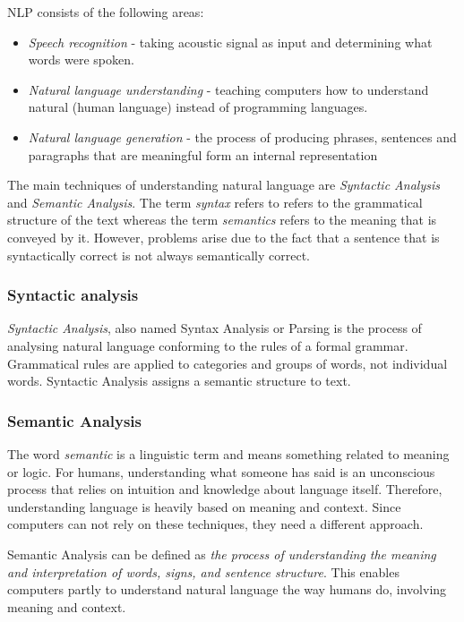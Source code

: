 \documentclass[12pt,a4paper]{article}
\begin{document}
NLP consists of the following areas:
\begin{itemize}
    \item \textit{Speech recognition} - taking acoustic signal as input and determining what words were spoken.
    \item \textit{Natural language understanding} - teaching computers how to understand natural (human language) instead of programming languages.
    \item \textit{Natural language generation} - the process of producing phrases, sentences and paragraphs that are meaningful form an internal representation \cite{Khurana2017}
\end{itemize}

The main techniques of understanding natural language are \textit{Syntactic Analysis} and \textit{Semantic Analysis}. The term \textit{syntax} refers to refers to the grammatical structure of the text whereas the term \textit{semantics} refers to the meaning that is conveyed by it. However, problems arise due to the fact that a sentence that is syntactically correct is not always semantically correct.

\subsubsection{Syntactic analysis}
\textit{Syntactic Analysis}, also named Syntax Analysis or Parsing is the process of analysing natural language conforming to the rules of a formal grammar. Grammatical rules are applied to categories and groups of words, not individual words. Syntactic Analysis assigns a semantic structure to text.

\subsubsection{Semantic Analysis}
The word \textit{semantic} is a linguistic term and means something related to meaning or logic.
For humans, understanding what someone has said is an unconscious process that relies on intuition and knowledge about language itself. Therefore, understanding language is heavily based on meaning and context. Since computers can not rely on these techniques, they need a different approach. 

Semantic Analysis can be defined as \textit{the process of understanding the meaning and interpretation of words, signs, and sentence structure}. This enables computers partly to understand natural language the way humans do, involving meaning and context.
\end{document}
